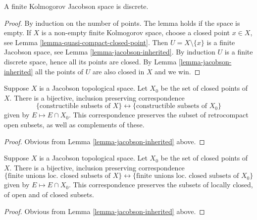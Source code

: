 \begin{lemma}
\label{lemma-finite-jacobson}
A finite Kolmogorov Jacobson space is discrete.
\end{lemma}

\begin{proof}
By induction on the number of points. The lemma holds if the space
is empty. If $X$ is a non-empty finite Kolmogorov space, choose a
closed point $x \in X$, see
Lemma \ref{lemma-quasi-compact-closed-point}. Then $U = X \setminus \{x\}$
is a finite Jacobson space, see Lemma \ref{lemma-jacobson-inherited}. By
induction $U$ is a finite discrete space, hence all its points are closed.
By Lemma \ref{lemma-jacobson-inherited} all the points of $U$ are also closed
in $X$ and we win.
\end{proof}

\begin{lemma}
\label{lemma-jacobson-equivalent-constructible}
Suppose $X$ is a Jacobson topological space.
Let $X_0$ be the set of closed points of $X$.
There is a bijective, inclusion preserving correspondence
$$
\{\text{constructible subsets of } X\}
\leftrightarrow
\{\text{constructible subsets of } X_0\}
$$
given by $E \mapsto E \cap X_0$. This correspondence preserves
the subset of retrocompact open subsets, as well as complements
of these.
\end{lemma}

\begin{proof}
Obvious from Lemma \ref{lemma-jacobson-inherited} above.
\end{proof}

\begin{lemma}
\label{lemma-jacobson-equivalent-locally-closed}
Suppose $X$ is a Jacobson topological space.
Let $X_0$ be the set of closed points of $X$.
There is a bijective, inclusion preserving correspondence
$$
\{\text{finite unions loc.\ closed subsets of } X\}
\leftrightarrow
\{\text{finite unions loc.\ closed subsets of } X_0\}
$$
given by $E \mapsto E \cap X_0$. This correspondence preserves
the subsets of locally closed, of open and of closed subsets.
\end{lemma}

\begin{proof}
Obvious from Lemma \ref{lemma-jacobson-inherited} above.
\end{proof}


















